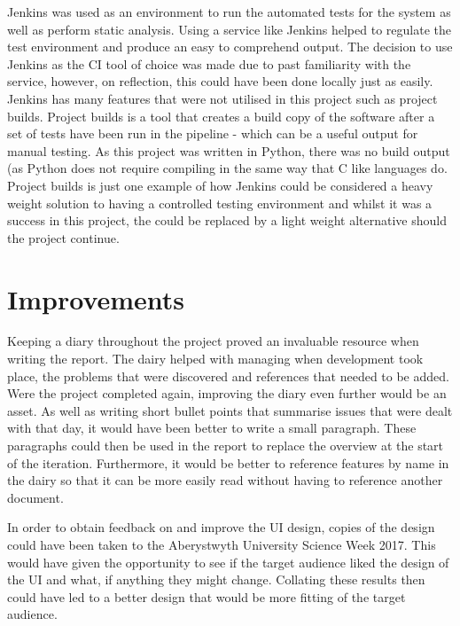 Jenkins was used as an environment to run the automated tests for the system as well as perform static analysis. Using a service like Jenkins helped to regulate the test environment and produce an easy to comprehend output. The decision to use Jenkins as the CI tool of choice was made due to past familiarity with the service, however, on reflection, this could have been done locally just as easily. Jenkins has many features that were not utilised in this project such as project builds. Project builds is a tool that creates a build copy of the software after a set of tests have been run in the pipeline - which can be a useful output for manual testing. As this project was written in Python, there was no build output (as Python does not require compiling in the same way that C like languages do. Project builds is just one example of how Jenkins could be considered a heavy weight solution to having a controlled testing environment and whilst it was a success in this project, the could be replaced by a light weight alternative should the project continue.

\newpage

\section{Improvements}
Keeping a diary throughout the project proved an invaluable resource when writing the report. The dairy helped with managing when development took place, the problems that were discovered and references that needed to be added. Were the project completed again, improving the diary even further would be an asset. As well as writing short bullet points that summarise issues that were dealt with that day, it would have been better to write a small paragraph. These paragraphs could then be used in the report to replace the overview at the start of the iteration. Furthermore, it would be better to reference features by name in the dairy so that it can be more easily read without having to reference another document.

In order to obtain feedback on and improve the UI design, copies of the design could have been taken to the Aberystwyth University Science Week 2017. This would have given the opportunity to see if the target audience liked the design of the UI and what, if anything they might change. Collating these results then could have led to a better design that would be more fitting of the target audience.


